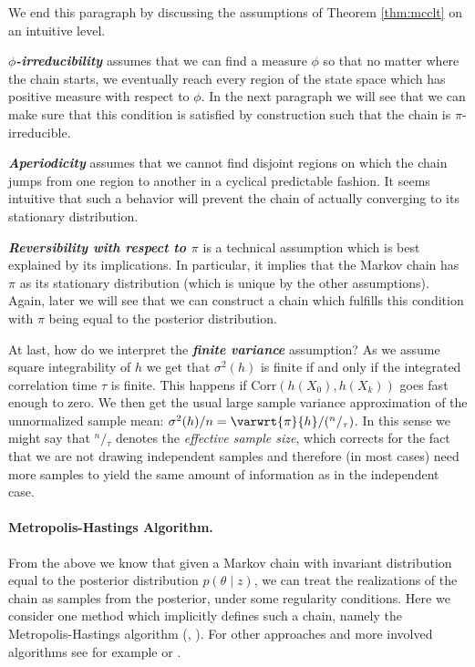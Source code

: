 \noindent
We end this paragraph by discussing the assumptions of Theorem \ref{thm:mcclt} on an intuitive level.

\textbf{\emph{$\phi$-irreducibility}} assumes that we can find a measure $\phi$ so that no matter where the chain starts, we eventually reach every region of the state space which has positive measure with respect to $\phi$.
In the next paragraph we will see that we can make sure that this condition is satisfied by construction such that the chain is $\pi$-irreducible.

\textbf{\emph{Aperiodicity}} assumes that we cannot find disjoint regions on which the chain jumps from one region to another in a cyclical predictable fashion.
It seems intuitive that such a behavior will prevent the chain of actually converging to its stationary distribution.

\textbf{\emph{Reversibility with respect to $\pi$}} is a technical assumption which is best explained by its implications.
In particular, it implies that the Markov chain has $\pi$ as its stationary distribution (which is unique by the other assumptions).
Again, later we will see that we can construct a chain which fulfills this condition with $\pi$ being equal to the posterior distribution.

At last, how do we interpret the \textbf{\emph{finite variance}} assumption?
As we assume square integrability of $h$ we get that $\sigma^2(h)$ is finite if and only if the integrated correlation time $\tau$ is finite.
This happens if $\text{Corr}(h(X_0), h(X_k))$ goes fast enough to zero.
We then get the usual large sample variance approximation of the unnormalized sample mean: $\sigma^2(h) / n = \varwrt{\pi}{h} / ({}^n/{}_\tau)$.
In this sense we might say that ${}^n/{}_\tau$ denotes the \emph{effective sample size}, which corrects for the fact that we are not drawing independent samples and therefore (in most cases) need more samples to yield the same amount of information as in the independent case.

\paragraph{Metropolis-Hastings Algorithm.}
From the above we know that given a Markov chain with invariant distribution equal to the posterior distribution $p(\theta \mid z)$, we can treat the realizations of the chain as samples from the posterior, under some regularity conditions.
Here we consider one method which implicitly defines such a chain, namely the Metropolis-Hastings algorithm (\citet{Metropolis1953}, \citet{hastings70}).
For other approaches and more involved algorithms see for example \citet{roberts2004} or \citet{liang10}.

